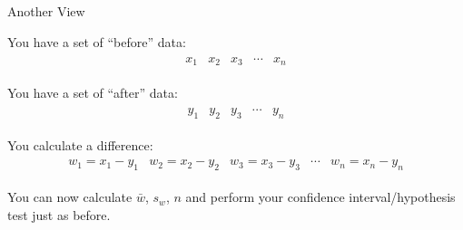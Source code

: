 \begin{frame}{Another View}

  You have a set of ``before'' data:
  \begin{eqnarray*}
    \begin{array}{lllll}
      x_1 & x_2 & x_3 & \cdots & x_n
    \end{array}
  \end{eqnarray*}

  {
    You have a set of ``after'' data:
    \begin{eqnarray*}
      \begin{array}{lllll}
        y_1 & y_2 & y_3 & \cdots & y_n
      \end{array}
    \end{eqnarray*}
  }

  {
    You calculate a difference:
    \begin{eqnarray*}
      \begin{array}{lllll}
        w_1=x_1-y_1 & w_2=x_2-y_2 & w_3=x_3-y_3 & \cdots & w_n=x_n-y_n
      \end{array}
    \end{eqnarray*}
  }

  {
    You can now calculate $\bar{w}$, $s_w$, $n$ and perform your
    confidence interval/hypothesis test just as before.
  }
    

  \vfill

\end{frame}

